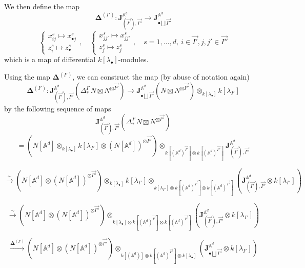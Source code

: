 \documentclass[11pt]{amsart}
\theoremstyle{definition}
\theoremstyle{remark}
\numberwithin{equation}{section}
\begin{document}
We then define the map
$$
\mathbf{\Delta}^{(I')}:\mathbf{J}^{\mathbb{A}^d}_{(\vec{I'}),\vec{{I''}}}\rightarrow \mathbf{J}^{\mathbb{A}^d}_{\bullet\bigsqcup \vec{I''}}
$$
$$
\begin{cases}
  x^s_{ij}\mapsto x^s_{\bullet j}\\
  z^s_i\mapsto z^s_{\bullet}
\end{cases}, \quad\begin{cases}x^s_{jj'}\mapsto x^s_{jj'}\\
 z^s_j\mapsto z^s_{j}
                    \end{cases}, \quad s=1,\dots,d, \ i\in \vec{I'}, j,j'\in \vec{I''}
$$
which is a map of differential $k[\lambda_{\bullet}]$-modules.

Using the map $\mathbf{\Delta}^{(I')}$, we can construct the map (by abuse of notation again)
$$
\mathbf{\Delta}^{(I')}:\mathbf{J}_{(\vec{I'}),\vec{{I''}}}^{\mathbb{A}^d}(\Delta^{I'}_*N\boxtimes N^{\boxtimes\vec{I''}})\rightarrow \mathbf{J}_{\bullet\bigsqcup\vec{I''}}^{\mathbb{A}^d}(N\boxtimes N^{\boxtimes\vec{I''}})\otimes_{k[\lambda_{\bullet}]}k[\lambda_{I'}]
$$
by the following sequence of maps
$$
\mathbf{J}_{(\vec{I'}),\vec{{I''}}}^{\mathbb{A}^d}(\Delta^{I'}_*N\boxtimes N^{\boxtimes\vec{I''}})
$$
$$
=\left(N[\mathbb{A}^d]\otimes_{k[\lambda_{\bullet}]}k[\lambda_{I'}]\otimes(N[\mathbb{A}^d])^{\otimes \vec{I''}}\right)\otimes_{k[(\mathbb{A}^d)^{\vec{I'}}]\otimes k[(\mathbb{A}^d)^{\vec{I''}}]}\mathbf{J}_{(\vec{I'}),\vec{{I''}}}^{\mathbb{A}^d}
$$

$$
\xrightarrow{\sim}\left(N[\mathbb{A}^d]\otimes(N[\mathbb{A}^d])^{\otimes \vec{I''}}\right)\otimes_{k[\lambda_{\bullet}]}k[\lambda_{I'}]\otimes_{k[\lambda_{I'}]\otimes k[(\mathbb{A}^d)^{\vec{I'}}]\otimes k[(\mathbb{A}^d)^{\vec{I''}}]}\left(\mathbf{J}_{(\vec{I'}),\vec{{I''}}}^{\mathbb{A}^d}\otimes k[\lambda_{I'}]\right)
$$

$$
\xrightarrow{\sim}\left(N[\mathbb{A}^d]\otimes(N[\mathbb{A}^d])^{\otimes \vec{I''}}\right)\otimes_{k[\lambda_{\bullet}]\otimes k[(\mathbb{A}^d)^{\vec{I'}}]\otimes k[(\mathbb{A}^d)^{\vec{I''}}]}\left(\mathbf{J}_{(\vec{I'}),\vec{{I''}}}^{\mathbb{A}^d}\otimes k[\lambda_{I'}]\right)
$$

$$
\xrightarrow{\mathbf{\Delta}^{(I')}}\left(N[\mathbb{A}^d]\otimes(N[\mathbb{A}^d])^{\otimes \vec{I''}}\right)\otimes_{k[(\mathbb{A}^d)]\otimes k[(\mathbb{A}^d)^{\vec{I''}}]\otimes k[\lambda_{\bullet}]}\left(\mathbf{J}_{\bullet\bigsqcup\vec{{I''}}}^{\mathbb{A}^d}\otimes k[\lambda_{I'}]\right)
$$
\end{document}
